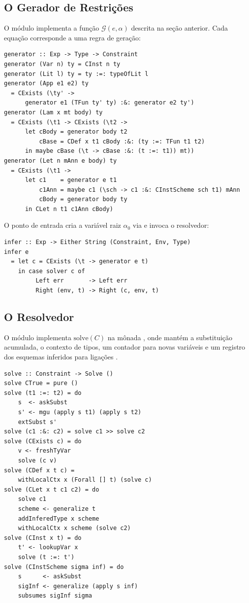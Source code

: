   \subsection{O Gerador de Restrições}

  O módulo  implementa a
  função \(\mathcal{G}(e, \alpha)\) descrita na seção anterior. Cada
  equação corresponde a uma regra de geração:

\begin{verbatim}
generator :: Exp -> Type -> Constraint
generator (Var n) ty = CInst n ty
generator (Lit l) ty = ty :=: typeOfLit l
generator (App e1 e2) ty
  = CExists (\ty' ->
      generator e1 (TFun ty' ty) :&: generator e2 ty')
generator (Lam x mt body) ty
  = CExists (\t1 -> CExists (\t2 ->
      let cBody = generator body t2
          cBase = CDef x t1 cBody :&: (ty :=: TFun t1 t2)
      in maybe cBase (\t -> cBase :&: (t :=: t1)) mt))
generator (Let n mAnn e body) ty
  = CExists (\t1 ->
      let c1    = generator e t1
          c1Ann = maybe c1 (\sch -> c1 :&: CInstScheme sch t1) mAnn
          cBody = generator body ty
      in CLet n t1 c1Ann cBody)
\end{verbatim}

  O ponto de entrada cria a variável raiz \(\alpha_0\) via
   e invoca o resolvedor:

\begin{verbatim}
infer :: Exp -> Either String (Constraint, Env, Type)
infer e
  = let c = CExists (\t -> generator e t)
    in case solver c of
         Left err       -> Left err
         Right (env, t) -> Right (c, env, t)
\end{verbatim}

  \subsection{O Resolvedor}

  O módulo  implementa
  \(\mathrm{solve}(C)\) na mônada , onde 
  mantém a substituição acumulada, o contexto de tipos, um contador
  para novas variáveis e um registro dos esquemas inferidos para
  ligações .

\begin{verbatim}
solve :: Constraint -> Solve ()
solve CTrue = pure ()
solve (t1 :=: t2) = do
    s  <- askSubst
    s' <- mgu (apply s t1) (apply s t2)
    extSubst s'
solve (c1 :&: c2) = solve c1 >> solve c2
solve (CExists c) = do
    v <- freshTyVar
    solve (c v)
solve (CDef x t c) =
    withLocalCtx x (Forall [] t) (solve c)
solve (CLet x t c1 c2) = do
    solve c1
    scheme <- generalize t
    addInferedType x scheme
    withLocalCtx x scheme (solve c2)
solve (CInst x t) = do
    t' <- lookupVar x
    solve (t :=: t')
solve (CInstScheme sigma inf) = do
    s      <- askSubst
    sigInf <- generalize (apply s inf)
    subsumes sigInf sigma
\end{verbatim}

